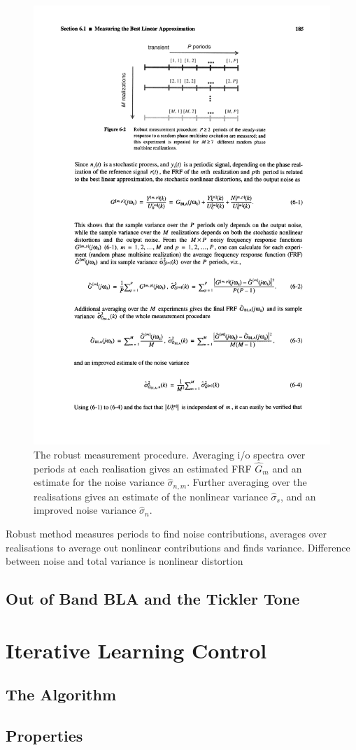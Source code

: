 	\begin{figure}[hbtp]
	\centering
		\includegraphics[width=0.5\linewidth]{images/robustMt.pdf}
		\caption{The robust measurement procedure. Averaging i/o spectra over periods at each realisation gives an estimated FRF $\hat{G}_m$ and an estimate for the noise variance $\hat{\sigma}_{n,m}$. Further averaging over the realisations gives an estimate of the nonlinear variance $\hat{\sigma}_s$, and an improved noise variance $\hat{\sigma}_{n}$.}
		\label{fig:robustMt}
	\end{figure}
	Robust method measures periods to find noise contributions, averages over realisations to average out nonlinear contributions and finds variance. Difference between noise and total variance is nonlinear distortion

	\subsection{Out of Band BLA and the Tickler Tone}

\section{Iterative Learning Control}
	\subsection{The Algorithm}
	\subsection{Properties}